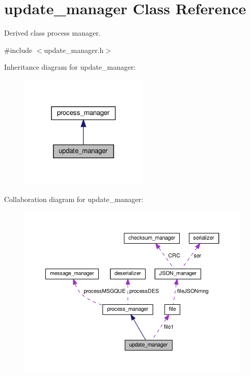 \hypertarget{classupdate__manager}{}\section{update\+\_\+manager Class Reference}
\label{classupdate__manager}


Derived class process manager.  




{\ttfamily \#include $<$update\+\_\+manager.\+h$>$}



Inheritance diagram for update\+\_\+manager\+:
\nopagebreak
\begin{figure}[H]
\begin{center}
\leavevmode
\includegraphics[width=174pt]{classupdate__manager__inherit__graph}
\end{center}
\end{figure}


Collaboration diagram for update\+\_\+manager\+:
\nopagebreak
\begin{figure}[H]
\begin{center}
\leavevmode
\includegraphics[width=350pt]{classupdate__manager__coll__graph}
\end{center}
\end{figure}
